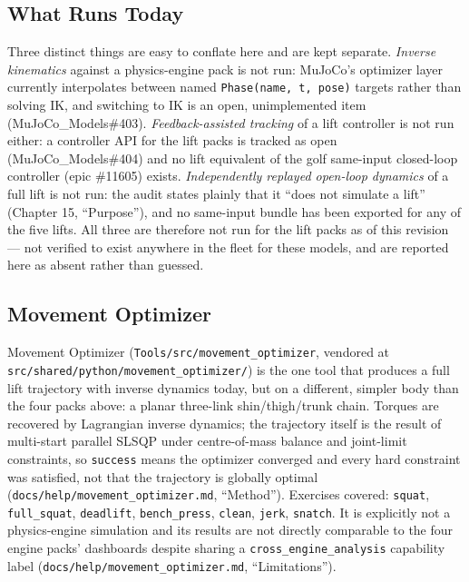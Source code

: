 \documentclass[11pt,a4paper]{article}
\begin{document}
\subsection{What Runs Today}
Three distinct things are easy to conflate here and are kept separate.
\emph{Inverse kinematics} against a physics-engine pack is not run: MuJoCo's
optimizer layer currently interpolates between named \texttt{Phase(name, t,
pose)} targets rather than solving IK, and switching to IK is an open,
unimplemented item (MuJoCo\_Models\#403). \emph{Feedback-assisted tracking} of
a lift controller is not run either: a controller API for the lift packs is
tracked as open (MuJoCo\_Models\#404) and no lift equivalent of the golf
same-input closed-loop controller (epic \#11605) exists. \emph{Independently
replayed open-loop dynamics} of a full lift is not run: the audit states
plainly that it ``does not simulate a lift'' (Chapter 15, ``Purpose''), and no
same-input bundle has been exported for any of the five lifts. All three are
therefore not run for the lift packs as of this revision --- not verified to
exist anywhere in the fleet for these models, and are reported here as absent
rather than guessed.

\subsection{Movement Optimizer}
Movement Optimizer (\texttt{Tools/src/movement\_optimizer}, vendored at
\texttt{src/shared/python/movement\_optimizer/}) is the one tool that produces
a full lift trajectory with inverse dynamics today, but on a different,
simpler body than the four packs above: a planar three-link shin/thigh/trunk
chain. Torques are recovered by Lagrangian inverse dynamics; the trajectory
itself is the result of multi-start parallel SLSQP under centre-of-mass
balance and joint-limit constraints, so \texttt{success} means the optimizer
converged and every hard constraint was satisfied, not that the trajectory is
globally optimal (\texttt{docs/help/movement\_optimizer.md}, ``Method'').
Exercises covered: \texttt{squat}, \texttt{full\_squat}, \texttt{deadlift},
\texttt{bench\_press}, \texttt{clean}, \texttt{jerk}, \texttt{snatch}. It is
explicitly not a physics-engine simulation and its results are not directly
comparable to the four engine packs' dashboards despite sharing a
\texttt{cross\_engine\_analysis} capability label
(\texttt{docs/help/movement\_optimizer.md}, ``Limitations'').
\end{document}
